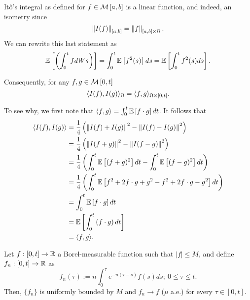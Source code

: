 \documentclass[../TGMAFFIRO.tex]{subfiles}
\begin{document}
\begin{remark}
	It\^o's integral as defined for $f\in\mathcal{M}\left[a, b\right]$ is a linear function, and indeed, an isometry since
	\begin{equation}
		\left\lVert I(f)\right\rVert_{[a,b]} = \left\lVert f\right\rVert_{[a, b]\times\Omega}.
	\end{equation}
	We can rewrite this last statement as
	\begin{equation}
		\mathbb{E}\left[\left(\int_0^t f dWs\right)\right] = \int_0^t\mathbb{E}\left[f^2(s)\right] ds = \mathbb{E}\left[\int_0^t f^2(s) ds\right].
	\end{equation}	 
	
	Consequently, for any $f, g \in \mathcal{M}\left[0, t\right]$
	\begin{equation}
		\langle I(f), I(g)\rangle_{\Omega} = \langle f, g\rangle_{\Omega\times[0, t]}.
	\end{equation}

To see why, we first note that $\langle f, g\rangle = \int_0^t\mathbb{E}\left[f\cdot g\right]dt$. It follows that
\begin{align*}
	\langle I(f), I(g)\rangle &= \frac{1}{4}\left(\left\lVert I(f) + I(g)\right\rVert^2 - \left\lVert I(f) - I(g)\right\rVert^2\right)\\
						   &= \frac{1}{4}\left(\left\lVert I(f + g)\right\rVert^2 - \left\lVert I(f - g)\right\rVert^2\right)\\
						   &= \frac{1}{4}\left(\int_0^t \mathbb{E}\left[(f+g)^2\right]dt - \int_0^t \mathbb{E}\left[(f-g)^2\right]dt\right)\\
						   &= \frac{1}{4}\left(\int_0^t\mathbb{E}\left[f^2 + 2f\cdot g + g^2 - f^2 + 2f\cdot g - g^2\right] dt\right)\\
						   &= \int_0^t\mathbb{E}\left[f\cdot g\right] dt \\
						   &= \mathbb{E}\left[\int_0^t \left(f\cdot g\right) dt\right]\\
						   &= \langle f, g\rangle.
\end{align*}
\end{remark}

\begin{proposition}\label{prop:bounded_simple_borel}
	Let $f:[0, t]\to \mathbb{R}$ a Borel-measurable function such that $|f|\leq M$, and define $f_n:[0, t]\to \mathbb{R}$ as
	\begin{equation}
		f_n(\tau) := n\int_0^\tau e^{-n(\tau-s)}f(s) ds; \ 0 \leq \tau \leq t.
	\end{equation}
Then, $\{f_n\}$ is uniformly bounded by $M$ and $f_n \to f$ ($\mu$ a.e.) for every $\tau\in [0, t]$.
\end{proposition}
\end{document}
